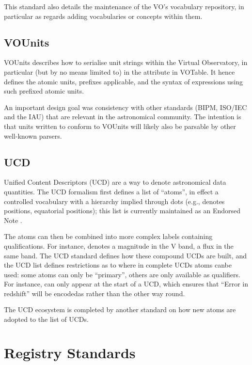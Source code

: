 \documentclass[11pt,letter]{ivoa}
\begin{document}
This standard also details the maintenance of the VO's vocabulary
repository, in particular as regards adding vocabularies or concepts
within them.

\subsection{VOUnits}

VOUnits \citep{2023ivoa.spec.1215G} describes how to serialise unit
strings within the Virtual
Observatory, in particular (but by no means limited to) in the
 attribute in VOTable.  It hence defines the atomic units,
prefixes applicable, and the syntax of expressions using such prefixed
atomic units. 

An important design goal was consistency with other standards (BIPM,
ISO/IEC and the IAU) that are relevant in the astronomical community.
The intention is that units written to conform to VOUnits will likely
also be parsable by other well-known parsers.

\subsection{UCD}

Unified Content Descriptors (UCD) \citep{2019ivoa.spec.1007G} are a way
to
denote astronomical data
quantities.  The UCD formalism first defines a list of ``atoms'', in
effect a controlled vocabulary with a hierarchy implied through dots
(e.g.,  denotes positions,  equatorial positions);
this list is currently maintained as an Endorsed Note
\citep{2021ivoa.spec.0125C}.

The atoms can then be combined into more complex labels containing
qualifications.  For instance,  denotes a
magnitude in the V band,  a flux in the same
band.  The UCD standard defines how these compound UCDs are built, and
the UCD list defines restrictions as to where in complete UCDs atoms canbe used: some atoms can only be ``primary'', others are only available
as qualifiers.  For instance,  can only appear at the
start of a UCD, which ensures that ``Error in redshift'' will be encodedas  rather than the other way round.

The UCD ecosystem is completed by another standard on how new atoms are
adopted to the list of UCDs.

\section{Registry Standards}
\end{document}
